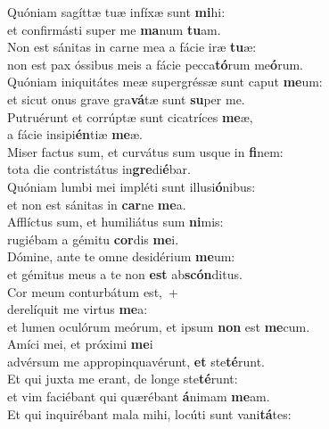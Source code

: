 \evenverse Quóniam sagíttæ tuæ infíxæ sunt \textbf{mi}hi:~\*\\
\evenverse et confirmásti super me \textbf{ma}num \textbf{tu}am.\\
\oddverse Non est sánitas in carne mea a fácie iræ \textbf{tu}æ:~\*\\
\oddverse non est pax óssibus meis a fácie pecca\textbf{tó}rum me\textbf{ó}rum.\\
\evenverse Quóniam iniquitátes meæ supergréssæ sunt caput \textbf{me}um:~\*\\
\evenverse et sicut onus grave gra\textbf{vá}tæ sunt \textbf{su}per me.\\
\oddverse Putruérunt et corrúptæ sunt cicatríces \textbf{me}æ,~\*\\
\oddverse a fácie insipi\textbf{én}tiæ \textbf{me}æ.\\
\evenverse Miser factus sum, et curvátus sum usque in \textbf{fi}nem:~\*\\
\evenverse tota die contristátus in\textbf{gre}di\textbf{é}bar.\\
\oddverse Quóniam lumbi mei impléti sunt illusi\textbf{ó}nibus:~\*\\
\oddverse et non est sánitas in \textbf{car}ne \textbf{me}a.\\
\evenverse Afflíctus sum, et humiliátus sum \textbf{ni}mis:~\*\\
\evenverse rugiébam a gémitu \textbf{cor}dis \textbf{me}i.\\
\oddverse Dómine, ante te omne desidérium \textbf{me}um:~\*\\
\oddverse et gémitus meus a te non \textbf{est} ab\textbf{scón}ditus.\\
\evenverse Cor meum conturbátum est,~+\\
\evenverse  derelíquit me virtus \textbf{me}a:~\*\\
\evenverse et lumen oculórum meórum, et ipsum \textbf{non} est \textbf{me}cum.\\
\oddverse Amíci mei, et próximi \textbf{me}i~\*\\
\oddverse advérsum me appropinquavérunt, \textbf{et} ste\textbf{té}runt.\\
\evenverse Et qui juxta me erant, de longe ste\textbf{té}runt:~\*\\
\evenverse et vim faciébant qui quærébant \textbf{á}nimam \textbf{me}am.\\
\oddverse Et qui inquirébant mala mihi, locúti sunt vani\textbf{tá}tes:~\*\\

